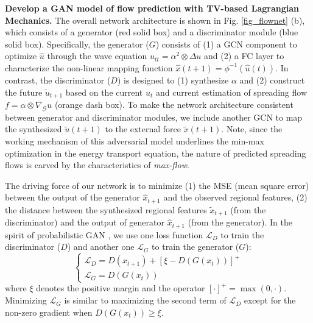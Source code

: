 \documentclass{article}
\begin{document}
\textbf{Develop a GAN model of flow prediction with TV-based Lagrangian Mechanics.} The overall network architecture is shown in Fig. \ref{fig_flownet} (b), which consists of a generator (red solid box) and a discriminator module (blue solid box). Specifically, the generator ($G$) consists of (1) a GCN component \cite{eliasof2021pde} to optimize $\hat{u}$ through the wave equation $u_{tt} =\alpha^2 \otimes \Delta u$ and (2) a FC layer to characterize the non-linear mapping function $\hat{x}(t+1)=\phi ^{-1} (\hat{u}(t))$. In contrast, the discriminator ($D$) is designed to (1) synthesize $\alpha$ and (2) construct the future $\tilde{u}_{t+1}$ based on the current $u_t$ and current estimation of spreading flow $f=\alpha \otimes \nabla_{\mathcal{G}}u$ (orange dash box). To make the network architecture consistent between generator and discriminator modules, we include another GCN to map the synthesized $\tilde {u}(t+1)$ to the external force $\tilde{x}(t+1)$. Note, since the working mechanism of this adversarial model underlines the min-max optimization in the energy transport equation, the nature of predicted spreading flows is carved by the characteristics of \textit{max-flow}.

The driving force of our network is to minimize (1) the MSE (mean square error) between the output of the generator $\hat {x}_{t+1}$ and the observed regional features, (2) the distance between the synthesized regional features  ${\tilde x_{t + 1}}$ (from the discriminator) and the output of generator $\hat {x}_{t+1}$  (from the generator). In the spirit of probabilistic GAN \cite{zhao2016energy}, we use one loss function $\mathcal{L}_D$ to train the discriminator ($D$) and another one $\mathcal{L}_G$ to train the generator ($G$):
\begin{equation}
    \left\{\begin{array}{c}\mathcal{L}_D=D\left(x_{t+1}\right)+\left[\xi-D\left(G\left(x_t\right)\right)\right]^{+} \\ \mathcal{L}_G=D\left(G\left(x_t\right)\right)\end{array}\right.
\end{equation}
where $\xi$ denotes the positive margin and the operator ${[\cdot]^ + } = \max (0,\cdot)$. Minimizing $\mathcal{L}_G$ is similar to maximizing the second term of $\mathcal{L}_D$ except for the non-zero gradient when $D(G(x_t))\ge \xi$.
\end{document}
